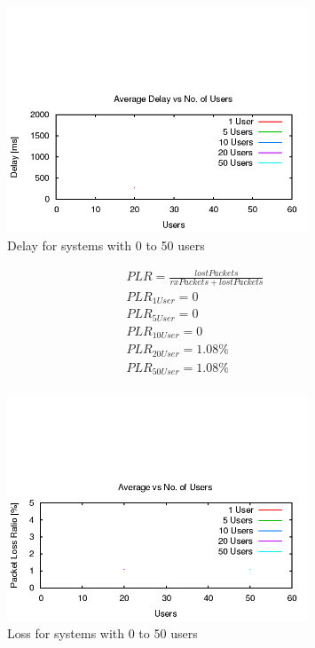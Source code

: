 \begin{figure}[H]
	\centering
	\includegraphics[width=0.8\textwidth]{images/EE500/QC/P2/Images/wifi-delay}
	\caption{Delay for systems with 0 to 50 users}
	\label{fig:QCP2delay}
\end{figure}

\begin{gather*}
	PLR=\frac{lostPackets}{rxPackets+lostPackets} \\
	PLR_{1 User}=0 \\
	PLR_{5 User}=0 \\
	PLR_{10 User}=0 \\
	PLR_{20 User}=1.08\% \\
	PLR_{50 User}=1.08\% \\
\end{gather*}

\begin{figure}[H]
	\centering
	\includegraphics[width=0.8\textwidth]{images/EE500/QC/P2/Images/wifi-loss}
	\caption{Loss for systems with 0 to 50 users}
	\label{fig:QCP2loss}
\end{figure}
